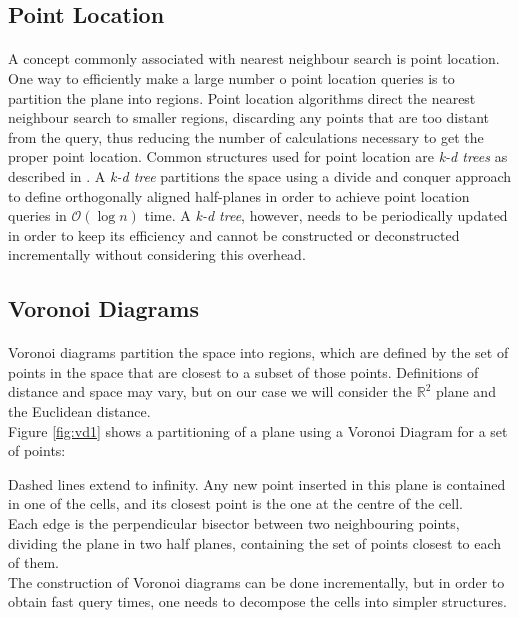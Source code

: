 \subsection{Point Location}
\paragraph{}
A concept commonly associated with nearest neighbour search is point location. 
One way to efficiently make a large number o point location queries is to partition the plane into regions. Point location algorithms direct the nearest neighbour search to smaller regions, discarding any points that are too distant from the query, thus reducing the number of calculations necessary to get the proper point location.
Common structures used for point location are \textit{k-d trees} as described in \citet{incrementalcov}. A \textit{k-d tree} partitions the space using a divide and conquer approach to define orthogonally aligned half-planes in order to achieve point location queries in $\mathcal{O}(\log{n})$ time. A \textit{k-d tree}, however, needs to be periodically updated in order to keep its efficiency and cannot be constructed or deconstructed incrementally without considering this overhead.
\subsection{Voronoi Diagrams}
\paragraph{}
Voronoi diagrams partition the space into regions, which are defined by the set of points in the space that are closest to a subset of those points. Definitions of distance and space may vary, but on our case we will consider the $\mathbb{R}^2$ plane and the Euclidean distance.\\
Figure \ref{fig:vd1} shows a partitioning of a plane using a Voronoi Diagram for a set of points:

\noindent
Dashed lines extend to infinity. Any new point inserted in this plane is contained in one of the cells, and its closest point is the one at the centre of the cell.\\
Each edge is the perpendicular bisector between two neighbouring points, dividing the plane in two half planes, containing the set of points closest to each of them.\\
The construction of Voronoi diagrams can be done incrementally, but in order to obtain fast query times, one needs to decompose the cells into simpler structures. 
